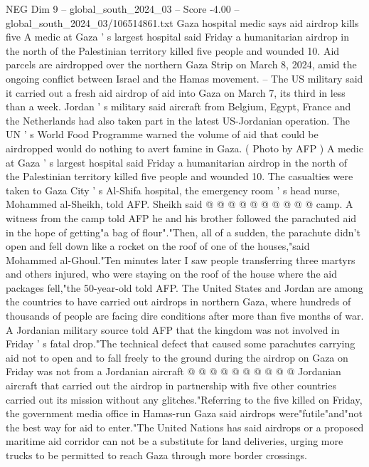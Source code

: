 \begin{textsample}{NEG Dim 9 – global\_south\_2024\_03 – Score -4.00 – global\_south\_2024\_03/106514861.txt}  \label{ex:f9_neg_374}
Gaza hospital medic says aid airdrop kills five A medic at Gaza ' s largest hospital said Friday a humanitarian airdrop in the north of the Palestinian territory killed five people and wounded 10.
Aid parcels are airdropped over the northern Gaza Strip on March 8, 2024, amid the ongoing conflict between Israel and the Hamas movement. -- The US military said it carried out a fresh aid airdrop of aid into Gaza on March 7, its third in less than a week.
Jordan ' s military said aircraft from Belgium, Egypt, France and the Netherlands had also taken part in the latest US-Jordanian operation.
The UN ' s World Food Programme warned the volume of aid that could be airdropped would do nothing to avert famine in Gaza. ( Photo by AFP ) A medic at Gaza ' s largest hospital said Friday a humanitarian airdrop in the north of the Palestinian territory killed five people and wounded 10.
The casualties were taken to Gaza City ' s Al-Shifa hospital, the emergency room ' s head nurse, Mohammed al-Sheikh, told AFP.
Sheikh said @ @ @ @ @ @ @ @ @ @ camp.
A witness from the camp told AFP he and his brother followed the parachuted aid in the hope of getting"a bag of flour"."Then, all of a sudden, the parachute didn't open and fell down like a rocket on the roof of one of the houses,"said Mohammed al-Ghoul."Ten minutes later I saw people transferring three martyrs and others injured, who were staying on the roof of the house where the aid packages fell,"the 50-year-old told AFP.
The United States and Jordan are among the countries to have carried out airdrops in northern Gaza, where hundreds of thousands of people are facing dire conditions after more than five months of war.
A Jordanian military source told AFP that the kingdom was not involved in Friday ' s fatal drop."The technical defect that caused some parachutes carrying aid not to open and to fall freely to the ground during the airdrop on Gaza on Friday was not from a Jordanian aircraft @ @ @ @ @ @ @ @ @ @ Jordanian aircraft that carried out the airdrop in partnership with five other countries carried out its mission without any glitches."Referring to the five killed on Friday, the government media office in Hamas-run Gaza said airdrops were"futile"and"not the best way for aid to enter."The United Nations has said airdrops or a proposed maritime aid corridor can not be a substitute for land deliveries, urging more trucks to be permitted to reach Gaza through more border crossings.

\end{textsample}
